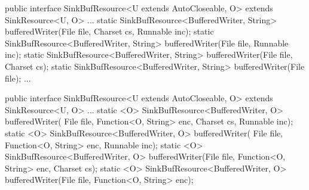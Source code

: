 \begin{elisting}[!htb]
\begin{javacode}
public interface SinkBufResource<U extends AutoCloseable, O> extends SinkResource<U, O> {
	...
    static SinkBufResource<BufferedWriter, String> bufferedWriter(File file, Charset cs, Runnable inc);
    static SinkBufResource<BufferedWriter, String> bufferedWriter(File file, Runnable inc);
    static SinkBufResource<BufferedWriter, String> bufferedWriter(File file, Charset cs);
    static SinkBufResource<BufferedWriter, String> bufferedWriter(File file);
	...
}
\end{javacode}
\caption{Metodi per creare una risorsa \texttt{SinkBufResource<BufferedWriter, String>}}
\label{lst:snkBufResStr}
\end{elisting}

\begin{elisting}[!htb]
\begin{javacode}
public interface SinkBufResource<U extends AutoCloseable, O> extends SinkResource<U, O> {
	...
    static <O> SinkBufResource<BufferedWriter, O> bufferedWriter(
    		File file, Function<O, String> enc, Charset cs, Runnable inc);
    static <O> SinkBufResource<BufferedWriter, O> bufferedWriter(
    		File file, Function<O, String> enc, Runnable inc);
    static <O> SinkBufResource<BufferedWriter, O> bufferedWriter(File file, Function<O, String> enc, Charset cs);
    static <O> SinkBufResource<BufferedWriter, O> bufferedWriter(File file, Function<O, String> enc);
}
\end{javacode}
\caption{Metodi per creare una risorsa \texttt{SinkBufResource<BufferedWriter, O>} con funzione di codifica}
\label{lst:snkBufResFcn}
\end{elisting}

